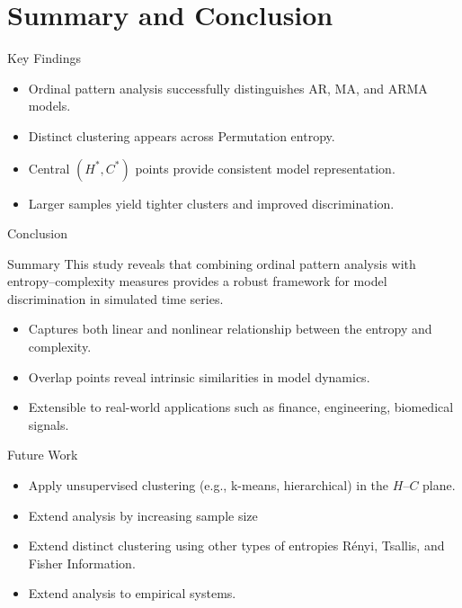 \documentclass[11pt]{beamer}
\begin{document}
\section{Summary and Conclusion}
\begin{frame}{Key Findings}
	\begin{itemize}
		\item Ordinal pattern analysis successfully distinguishes AR, MA, and ARMA models.
		\item Distinct clustering appears across Permutation entropy.
		\item Central $(H^*, C^*)$ points provide consistent model representation.
		\item Larger samples yield tighter clusters and improved discrimination.
	\end{itemize}
\end{frame}

\begin{frame}{Conclusion}
	\begin{block}{Summary}
		This study reveals that combining ordinal pattern analysis with entropy–complexity measures provides a robust framework for model discrimination in simulated time series.
	\end{block}
	\begin{itemize}
		\item Captures both linear and nonlinear relationship between the entropy and complexity.
		\item Overlap points reveal intrinsic similarities in model dynamics.
		\item Extensible to real-world applications such as finance, engineering, biomedical signals.
	\end{itemize}
\end{frame}

\begin{frame}{Future Work}
	\begin{itemize}
		\item Apply unsupervised clustering (e.g., k-means, hierarchical) in the $H–C$ plane.
		\item Extend analysis by increasing sample size
		\item Extend distinct clustering using other types of entropies Rényi, Tsallis, and Fisher Information. 
		\item Extend analysis to empirical systems.
	\end{itemize}
\end{frame}
\end{document}

